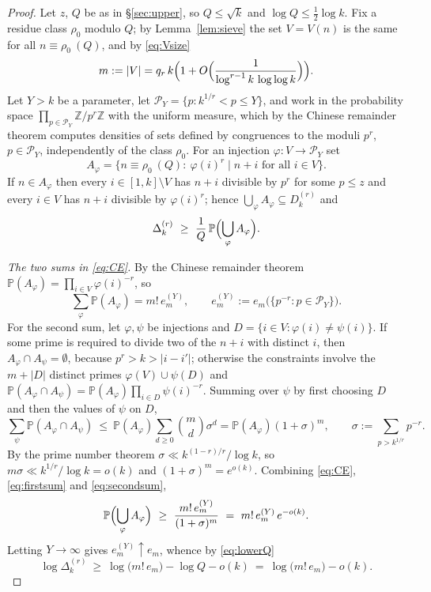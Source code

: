 \documentclass[10pt,a4paper]{amsart}
\numberwithin{equation}{section}
\newcommand{\Z}{\mathbb{Z}}
\begin{document}
\begin{proof}
Let $z$, $Q$ be as in \S\ref{sec:upper}, so $Q\le\sqrt k$ and $\log Q\le\frac12\log k$.
Fix a residue class $\rho_0$ modulo $Q$; by Lemma~\ref{lem:sieve} the set $V=V(n)$ is the
same for all $n\equiv\rho_0\ (Q)$, and by \eqref{eq:Vsize}
\begin{equation}\label{eq:m-lower}
  m:=|V|=q_r\,k\Bigl(1+O\Bigl(\frac1{\log^{r-1}k\,\log\log k}\Bigr)\Bigr).
\end{equation}
Let $Y>k$ be a parameter, let $\mathcal P_Y=\{p:k^{1/r}<p\le Y\}$, and work in the
probability space $\prod_{p\in\mathcal P_Y}\Z/p^{r}\Z$ with the uniform measure, which by
the Chinese remainder theorem computes densities of sets defined by congruences to the
moduli $p^{r}$, $p\in\mathcal P_Y$, independently of the class $\rho_0$. For an injection
$\varphi:V\to\mathcal P_Y$ set
\[
  A_\varphi=\{n\equiv\rho_0\ (Q):\ \varphi(i)^{r}\mid n+i\text{ for all }i\in V\}.
\]
If $n\in A_\varphi$ then every $i\in[1,k]\setminus V$ has $n+i$ divisible by $p^{r}$ for
some $p\le z$ and every $i\in V$ has $n+i$ divisible by $\varphi(i)^{r}$; hence
$\bigcup_\varphi A_\varphi\subseteq D^{(r)}_k$ and
\begin{equation}\label{eq:lowerQ}
  \Delta^{(r)}_k\ \ge\ \frac1Q\,\mathbb P\Bigl(\bigcup_\varphi A_\varphi\Bigr).
\end{equation}

\emph{The two sums in \eqref{eq:CE}.}
By the Chinese remainder theorem $\mathbb P(A_\varphi)=\prod_{i\in V}\varphi(i)^{-r}$, so
\begin{equation}\label{eq:firstsum}
  \sum_\varphi\mathbb P(A_\varphi)=m!\,e_m^{(Y)},\qquad
  e^{(Y)}_m:=e_m\bigl(\{p^{-r}:p\in\mathcal P_Y\}\bigr).
\end{equation}
For the second sum, let $\varphi,\psi$ be injections and $D=\{i\in V:\varphi(i)\ne\psi(i)\}$.
If some prime is required to divide two of the $n+i$ with distinct $i$, then
$A_\varphi\cap A_\psi=\emptyset$, because $p^{r}>k>|i-i'|$; otherwise the constraints
involve the $m+|D|$ distinct primes $\varphi(V)\cup\psi(D)$ and
$\mathbb P(A_\varphi\cap A_\psi)=\mathbb P(A_\varphi)\prod_{i\in D}\psi(i)^{-r}$. Summing
over $\psi$ by first choosing $D$ and then the values of $\psi$ on $D$,
\begin{equation}\label{eq:secondsum}
  \sum_\psi\mathbb P(A_\varphi\cap A_\psi)\ \le\ \mathbb P(A_\varphi)
  \sum_{d\ge0}\binom{m}{d}\sigma^{d}=\mathbb P(A_\varphi)(1+\sigma)^{m},
  \qquad\sigma:=\sum_{p>k^{1/r}}p^{-r}.
\end{equation}
By the prime number theorem $\sigma\ll k^{(1-r)/r}/\log k$, so
$m\sigma\ll k^{1/r}/\log k=o(k)$ and $(1+\sigma)^{m}=e^{o(k)}$. Combining
\eqref{eq:CE}, \eqref{eq:firstsum} and \eqref{eq:secondsum},
\[
  \mathbb P\Bigl(\bigcup_\varphi A_\varphi\Bigr)\ \ge\
  \frac{m!\,e^{(Y)}_m}{(1+\sigma)^{m}}\ =\ m!\,e^{(Y)}_m\,e^{-o(k)} .
\]
Letting $Y\to\infty$ gives $e^{(Y)}_m\uparrow e_m$, whence by \eqref{eq:lowerQ}
\begin{equation}\label{eq:lower-reduction}
  \log\Delta^{(r)}_k\ \ge\ \log\bigl(m!\,e_m\bigr)-\log Q-o(k)
  \ =\ \log\bigl(m!\,e_m\bigr)-o(k).
\end{equation}


\end{proof}
\end{document}
